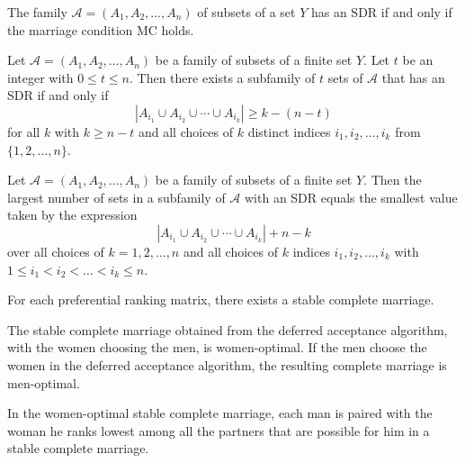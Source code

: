 \begin{theorem}
  \label{thm:9.2.2}
  The family $\mathcal{A} = (A_1, A_2 ,\ldots , A_n)$ of subsets of a set $Y$ has an SDR if and only
  if the marriage condition MC holds.
\end{theorem}

\begin{theorem}
  \label{thm:9.2.3}
  Let $\mathcal{A} = (A_1, A_2 ,\ldots , A_n)$ be a family of subsets of a finite set $Y$. Let $t$ 
  be an integer with $0 \leq t \leq n$. Then there exists a subfamily of $t$ sets of $\mathcal{A}$ 
  that has an SDR if and only if
  \begin{equation}\label{9.2}
    \left|A_{i_1} \cup A_{i_2} \cup \cdots \cup A_{i_k}\right| \geq k - (n -t) 
  \end{equation}
  for all $k$ with $k \geq n-t$ and all choices of $k$ distinct indices $i_1, i_2, \ldots, i_k$ 
  from $\{1,2, \ldots, n\}$.
\end{theorem}

\begin{theorem}
  \label{thm:9.2.4}
  Let $\mathcal{A} = (A_1, A_2 ,\ldots , A_n)$ be a family of subsets of a finite set $Y$. Then the 
  largest number of sets in a subfamily of $\mathcal{A}$ with an SDR equals the smallest value taken
  by the expression
  \begin{equation}\label{9.4}
    \left|A_{i_1} \cup A_{i_2} \cup \cdots \cup A_{i_k}\right| + n -k
  \end{equation}
  over all choices of $k = 1,2, \ldots ,n$ and all choices of $k$ indices $i_1, i_2, \ldots, i_k$ 
  with $1 \leq i_1 < i_2 <\ldots< i_k \leq n$.
\end{theorem}

\begin{theorem}
  \label{thm:9.3.1}
  For each preferential ranking matrix, there exists a stable complete marriage.
\end{theorem}

\begin{theorem}
  \label{thm:9.3.2}
  The stable complete marriage obtained from the deferred acceptance algorithm, with the women 
  choosing the men, is women-optimal. If the men choose the women in the deferred acceptance 
  algorithm, the resulting complete marriage is men-optimal.
\end{theorem}

\begin{corollary}
  \label{cor:9.3.3}
  In the women-optimal stable complete marriage, each man is paired with the woman he ranks lowest 
  among all the partners that are possible for him in a stable complete marriage.
\end{corollary}

